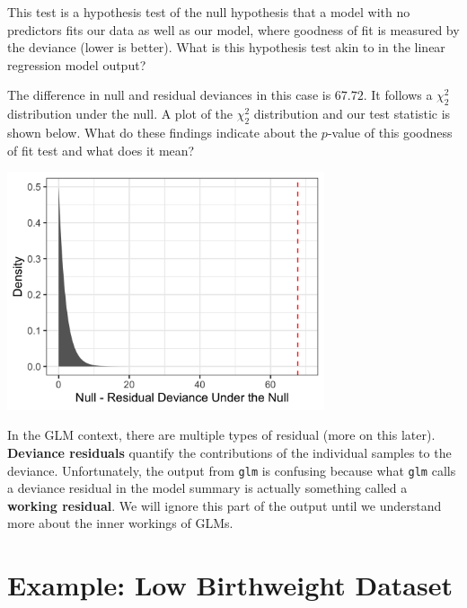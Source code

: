\begin{question}{}
This test is a hypothesis test of the null hypothesis that a model with no predictors fits our data as well as our model, where goodness of fit is measured by the deviance (lower is better). What is this hypothesis test akin to in the linear regression model output?
\end{question}

\begin{question}{}
The difference in null and residual deviances in this case is $67.72$. It follows a $\chi^2_2$ distribution under the null. A plot of the $\chi^2_2$ distribution and our test statistic is shown below. What do these findings indicate about the $p$-value of this goodness of fit test and what does it mean?
\begin{center}
\includegraphics[width=0.7\textwidth]{img/logreg-example-goodness-of-fit-test.png}
\end{center}
\end{question}

In the GLM context, there are multiple types of residual (more on this later). \textbf{Deviance residuals} quantify the contributions of the individual samples to the deviance. Unfortunately, the output from \texttt{glm} is confusing because what \texttt{glm} calls a deviance residual in the model summary is actually something called a \textbf{working residual}. We will ignore this part of the output until we understand more about the inner workings of GLMs. 


\section{Example: Low Birthweight Dataset \label{sect:lowbwt}}

